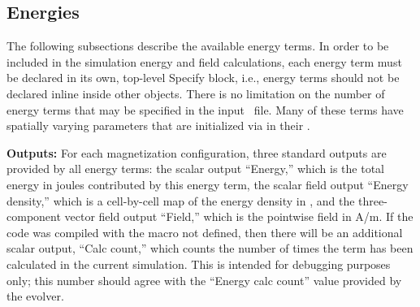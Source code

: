 \subsection{Energies}\label{sec:oxsEnergies}
The following subsections describe the available energy terms.  In
order to be included in the simulation energy and field calculations,
each energy term must be declared in its own, top-level Specify block,
i.e., energy terms should not be declared inline inside other
 objects.  There is no limitation on the number of energy
terms that may be specified in the input \MIF\ file.  Many of these
terms have spatially varying parameters that are initialized via
 in their
.

\textbf{Outputs:} For each magnetization configuration, three standard
outputs are provided by all energy terms: the scalar output
``Energy,'' which is the total energy in joules contributed by this
energy term, the scalar field output ``Energy density,'' which is a
cell-by-cell map of the energy density in
,
and the three-component vector field output ``Field,'' which is the
pointwise field in A/m.  If the code was compiled with the macro
 not defined, then there will be an additional scalar
output, ``Calc count,'' which counts the number of times the term has
been calculated in the current simulation.  This is intended for
debugging purposes only; this number should agree with the ``Energy
calc count'' value provided by the evolver.

